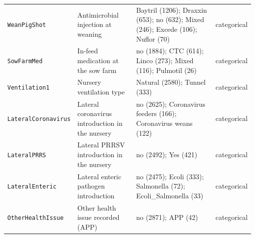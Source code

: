 \begin{longtable}{p{4.1cm} p{5.6cm} p{4.9cm} p{1.5cm}}
\texttt{WeanPigShot} & Antimicrobial injection at weaning & Baytril (1206); Draxxin (653); no (632); Mixed (246); Excede (106); Nuflor (70) & categorical \\
\texttt{SowFarmMed} & In-feed medication at the sow farm & no (1884); CTC (614); Linco (273); Mixed (116); Pulmotil (26) & categorical \\
\texttt{Ventilation1} & Nursery ventilation type & Natural (2580); Tunnel (333) & categorical \\
\texttt{LateralCoronavirus} & Lateral coronavirus introduction in the nursery & no (2625); Coronavirus feeders (166); Coronavirus weans (122) & categorical \\
\texttt{LateralPRRS} & Lateral PRRSV introduction in the nursery & no (2492); Yes (421) & categorical \\
\texttt{LateralEnteric} & Lateral enteric pathogen introduction & no (2475); Ecoli (333); Salmonella (72); Ecoli\_Salmonella (33) & categorical \\
\texttt{OtherHealthIssue} & Other health issue recorded (APP) & no (2871); APP (42) & categorical \\
\hline
\end{longtable}